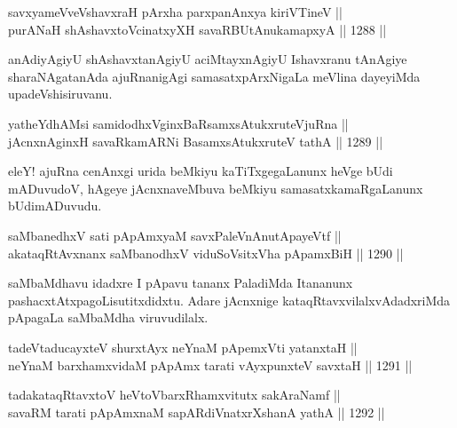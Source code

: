 \begin{shl}
savxyameVveVshavxraH pArxha parxpanAnxya kiriVTineV || \\
purANaH shAshavxtoV\s cinatxyXH savaRBUtAnukamapxyA \hfill || 1288 ||  
\end{shl}

\begin{artha}
anAdiyAgiyU shAshavxtanAgiyU aciMtayxnAgiyU Ishavxranu tAnAgiye sharaNAgatanAda ajuRnanigAgi samasatxpArxNigaLa meVlina dayeyiMda upadeVshisiruvanu.
\end{artha}


\begin{shl}
yatheYdhAMsi samidodhxV\s ginxBaRsamxsAtukxruteV\s juRna || \\
jAcnxnAginxH savaRkamARNi BasamxsAtukxruteV tathA \hfill || 1289 ||  
\end{shl}

\begin{artha}
eleY! ajuRna cenAnxgi urida beMkiyu kaTiTxgegaLanunx heVge bUdi mADuvudoV, hAgeye jAcnxnaveMbuva beMkiyu samasatxkamaRgaLanunx bUdimADuvudu.
\end{artha}


\begin{shl}
saMbanedhxV sati pApAmx\s yaM savxPaleVnAnutApayeVtf || \\
akataqRtAvxnanx saMbanodhxV viduSoV\s sitxVha pApamxBiH \hfill || 1290 ||  
\end{shl}

\begin{artha}
saMbaMdhavu idadxre I pApavu tananx PaladiMda Itananunx pashacxtAtxpagoLisutitxdidxtu. Adare jAcnxnige kataqRtavxvilalxvAdadxriMda pApagaLa saMbaMdha viruvudilalx.
\end{artha}


\begin{shl}
tadeVtaducayxteV shurxtAyx neYnaM pApemxVti yatanxtaH ||  \\
neYnaM barxhamxvidaM pApAmx tarati vAyxpunxteV savxtaH \hfill || 1291 ||  
\end{shl}

\begin{shl}
tadakataqRtavxtoV heVtoVbarxRhamxvitutx sakAraNamf ||  \\
savaRM tarati pApAmxnaM sapARdiVnatxrXshanA yathA \hfill || 1292 ||  
\end{shl}

